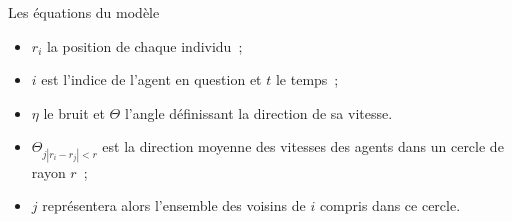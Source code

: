 \documentclass[aspectratio=43, a4paper, 12pt]{beamer}
\begin{document}
\begin{frame}{Les équations du modèle}

		\begin{itemize}
				   \item<1-3> $r_{i}$ la position de chaque individu~;
				   \item<2-3> $i$ est l'indice de l'agent en question et $t$ le temps~;
					\item<3-3> $\eta$ le bruit et $\Theta$ l’angle définissant la direction de sa vitesse.
		\end{itemize}
				
		\vspace{-2cm} 
		\begin{itemize}
				   \item<4-> $\Theta_{j |r_{i}-r_{j}|<r}$ est la direction moyenne des vitesses des agents dans un cercle de rayon $r$~;
					\item<5->  $j$ représentera alors l'ensemble des voisins de $i$ compris dans ce cercle.		
					
		\end{itemize}
	\end{frame}
	
\end{document}
